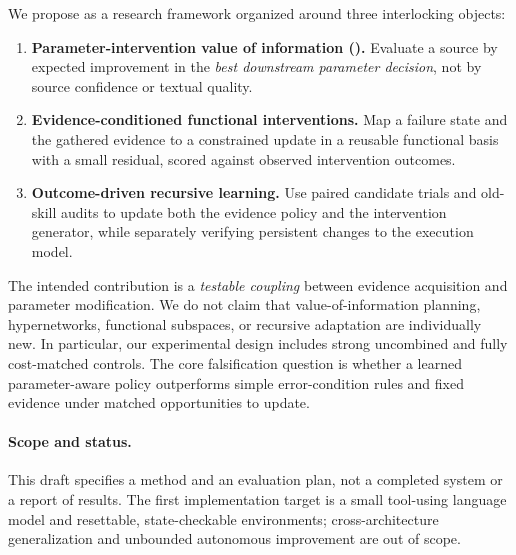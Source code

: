 We propose \spear{} as a research framework organized around three
interlocking objects:
\begin{enumerate}
\item \textbf{Parameter-intervention value of information (\pivoi).}
      Evaluate a source by expected improvement in the \emph{best downstream
      parameter decision}, not by source confidence or textual quality.
\item \textbf{Evidence-conditioned functional interventions.}
      Map a failure state and the gathered evidence to a constrained update
      in a reusable functional basis with a small residual, scored against
      observed intervention outcomes.
\item \textbf{Outcome-driven recursive learning.}
      Use paired candidate trials and old-skill audits to update both the
      evidence policy and the intervention generator, while separately
      verifying persistent changes to the execution model.
\end{enumerate}

The intended contribution is a \emph{testable coupling} between evidence
acquisition and parameter modification. We do not claim that value-of-information
planning, hypernetworks, functional subspaces, or recursive adaptation are
individually new. In particular, our experimental design includes strong
uncombined and fully cost-matched controls. The core falsification question is
whether a learned parameter-aware policy outperforms simple error-condition
rules and fixed evidence under matched opportunities to update.

\paragraph{Scope and status.}
This draft specifies a method and an evaluation plan, not a completed system
or a report of results. The first implementation target is a small
tool-using language model and resettable, state-checkable environments;
cross-architecture generalization and unbounded autonomous improvement are
out of scope.

